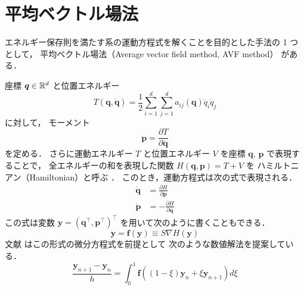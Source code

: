 %

\chapter{平均ベクトル場法}\label{chap:ode_avf}

エネルギー保存則を満たす系の運動方程式を解くことを目的とした手法の 1 つとして，
平均ベクトル場法（Average vector field method, AVF method） \cite{Quispel2008} がある．

座標 $\bm{q} \in \mathbb{R}^d$ と位置エネルギー
\begin{equation}
    T(\bm{q}, \dot{\bm{q}}) = \frac{1}{2} \sum_{i=1}^d \sum_{j=1}^d a_{ij}(\bm{q}) \dot{q}_i \dot{q}_j
\end{equation}
に対して，
モーメント
\begin{equation}
    \bm{p} = \frac{\partial T}{\partial \dot{\bm{q}}}
\end{equation}
を定める．
さらに運動エネルギー $T$ と位置エネルギー $V$ を座標 $\bm{q}$, $\bm{p}$ で表現することで，
全エネルギーの和を表現した関数 $H(\bm{q}, \bm{p}) = T + V$ を
ハミルトニアン（Hamiltonian）と呼ぶ
\cite[Section 3.2]{Morse1953}．
このとき，運動方程式は次の式で表現される．
\begin{align}
    \dot{\bm{q}} & = \frac{\partial H}{\partial \bm{p}}  \\
    \dot{\bm{p}} & = -\frac{\partial H}{\partial \bm{q}}
\end{align}
この式は変数 $\bm{y} = (\bm{q}^\top, \bm{p}^\top)^\top$ を用いて次のように書くこともできる．
\begin{equation}
    \dot{\bm{y}} = \bm{f}(\bm{y}) \equiv S \nabla H(\bm{y})
\end{equation}
文献 \cite{Quispel2008} はこの形式の微分方程式を前提として
次のような数値解法を提案している．
\begin{equation}
    \frac{\bm{y}_{n+1} - \bm{y}_n}{h}
    = \int_{0}^{1} \bm{f}((1 - \xi) \bm{y}_n + \xi \bm{y}_{n+1}) d \xi
    \label{eq:ode_average-vector-field_update-2-order}
\end{equation}

